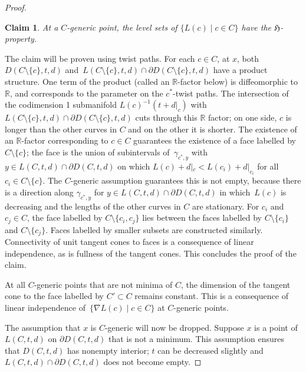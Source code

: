 \documentclass[11pt]{article}
\numberwithin{equation}{section}
\numberwithin{equation}{section}
\newtheorem*{Claim}{Claim}
{ \theoremstyle{definition}
 \newtheorem{Definition}[Theorem]{Definition}
 \newtheorem{Note}[Theorem]{Note}
 \newtheorem{Example}[Theorem]{Example}
 \newtheorem{Remark}[Theorem]{Remark}
 \newtheorem{observation}[Theorem]{Observation}
}
\begin{document}
\begin{proof}
\begin{Claim} At a $C$-generic point, the level sets of $\{L(c) \mid c\in C\}$ have the $\mathfrak{H}$-property.
\end{Claim}

The claim will be proven using twist paths. For each $c\in C$, at $x$, both $D(C\setminus \{c\},t,d)$ and~${L(C\setminus \{c\},t,d)\cap \partial D(C\setminus \{c\},t,d)}$ have a product structure. One term of the product (called an $\mathbb{R}$-factor below) is diffeomorphic to $\mathbb{R}$, and corresponds to the parameter on the $c^{*}$-twist paths. The intersection of the codimension 1 submanifold $L(c)^{-1}(t+d|_{c})$ with $L(C\setminus \{c\},t,d)\cap \partial D(C\setminus \{c\},t,d)$ cuts through this $\mathbb{R}$ factor; on one side, $c$ is longer than the other curves in $C$ and on the other it is shorter. The existence of an $\mathbb{R}$-factor corresponding to $c\in C$ guarantees the existence of a face labelled by $C\setminus \{c\}$; the face is the union of subintervals of~$\gamma_{c^{*},y}$ with~${y\in L(C,t,d)\cap \partial D(C,t,d)}$ on which $L(c)+d|_{c}<L(c_{i})+d|_{c_{i}}$ for all $c_{i}\in C\setminus \{c\}$. The $C$-generic assumption guarantees this is not empty, because there is a direction along $\gamma_{c^{*},y}$ for $y\in L(C,t,d)\cap \partial D(C,t,d)$ in which~$L(c)$ is decreasing and the lengths of the other curves in $C$ are stationary. For $c_{i}$ and $c_{j}\in C$, the face labelled by $C\setminus \{c_{i}, c_{j}\}$ lies between the faces labelled by $C\setminus \{c_{i}\}$ and $C\setminus \{c_{j}\}$. Faces labelled by smaller subsets are constructed similarly. Connectivity of unit tangent cones to faces is a consequence of linear independence, as is fullness of the tangent cones. This concludes the proof of the claim.

At all $C$-generic points that are not minima of $C$, the dimension of the tangent cone to the face labelled by $C'\subset C$ remains constant. This is a consequence of linear independence of~${\{\nabla L(c) \mid c\in C\}}$ at $C$-generic points.

The assumption that $x$ is $C$-generic will now be dropped. Suppose $x$ is a point of $L(C,t,d)$ on $\partial D(C,t,d)$ that is not a minimum. This assumption ensures that $D(C,t,d)$ has nonempty interior; $t$ can be decreased slightly and $L(C,t,d)\cap\partial D(C,t,d)$ does not become empty.


\end{proof}
\end{document}
